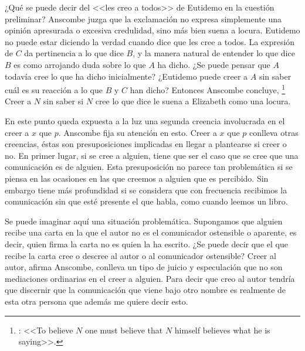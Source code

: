 ¿Qué se puede decir del <<les creo a todos>> de Eutidemo en la cuestión
preliminar? Anscombe juzga que la exclamación no expresa simplemente una opinión
apresurada o excesiva credulidad, sino más bien suena a
locura\autocite[5]{anscombe2008faith:tobelieve}. Eutidemo no puede estar
diciendo la verdad cuando dice que les cree a todos. La expresión de $C$ da
pertinencia a lo que dice $B$, y la manera natural de entender lo que dice $B$
es como arrojando duda sobre lo que $A$ ha dicho. ¿Se puede pensar que $A$
todavía cree lo que ha dicho inicialmente? ¿Eutidemo puede creer a $A$ sin saber
cuál es su reacción a lo que $B$ y $C$ han dicho? Entonces Anscombe concluye,
\footnote{\cite[5]{anscombe2008faith:tobelieve}: <<To believe $N$ one
  must believe that $N$ himself believes what he is saying>>.} Creer a $N$ sin
saber si $N$ cree lo que dice le suena a Elizabeth como una locura.

En este punto queda expuesta a la luz una segunda creencia involucrada en el
creer a $x$ que $p$. Anscombe fija su atención en esto. Creer a $x$ que $p$
conlleva otras creencias, éstas son presuposiciones implicadas en llegar a
plantearse si creer o no. En primer lugar, si se cree a alguien, tiene que ser
el caso que se cree que una comunicación es de
alguien\autocite[Cf.~][6]{anscombe2008faith:tobelieve}. Esta presuposición no
parece tan problemática si se piensa en las ocasiones en las que creemos a
alguien que es percibido. Sin embargo tiene más profundidad si se considera que
con frecuencia recibimos la comunicación sin que esté presente el que habla,
como cuando leemos un libro\autocite[Cf.~][5]{anscombe2008faith:tobelieve}.

Se puede imaginar aquí una situación problemática. Supongamos que alguien recibe
una carta en la que el autor no es el comunicador ostensible o aparente, es
decir, quien firma la carta no es quien la ha escrito. ¿Se puede decir que el
que recibe la carta cree o descree al autor o al comunicador ostensible? Creer
al autor, afirma Anscombe, conlleva un tipo de juicio y especulación que no son
mediaciones ordinarias en el creer a
alguien\autocite[Cf.~][7]{anscombe2008faith:tobelieve}. Para decir que creo al
autor tendría que discernir que la comunicación que viene bajo otro nombre es
realmente de esta otra persona que además me quiere decir esto.

